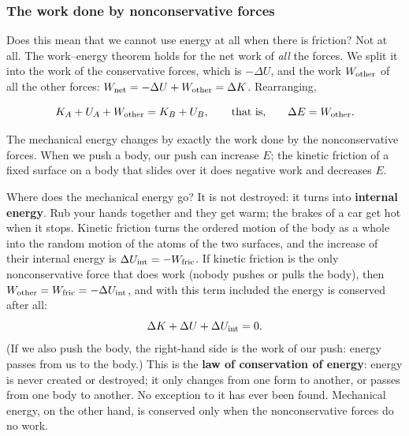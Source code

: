 \documentclass[11pt,a4paper]{article}
\begin{document}
\subsubsection{The work done by nonconservative forces}\label{sec:Wother}

Does this mean that we cannot use energy at all when there is friction? Not at all. The work--energy
theorem holds for the net work of \emph{all} the forces. We split it into the work of the
conservative forces, which is $-\Delta U$, and the work $W_{\mathrm{other}}$ of all the other forces:
$W_{\mathrm{net}} = -\Delta U + W_{\mathrm{other}} = \Delta K$. Rearranging,
\begin{keyresult}
\[
  K_A + U_A + W_{\mathrm{other}} = K_B + U_B , \qquad\text{that is,}\qquad \Delta E = W_{\mathrm{other}} .
\]
\end{keyresult}
The mechanical energy changes by exactly the work done by the nonconservative forces. When we push a
body, our push can increase $E$; the kinetic friction of a fixed surface on a body that slides over
it does negative work and decreases $E$.

Where does the mechanical energy go? It is not destroyed: it turns into \textbf{internal energy}.
Rub your hands together and they get warm; the brakes of a car get hot when it stops. Kinetic
friction turns the ordered motion of the body as a whole into the random motion of the atoms of the
two surfaces, and the increase of their internal energy is $\Delta U_{\mathrm{int}} = -W_{\mathrm{fric}}$. If
kinetic friction is the only nonconservative force that does work (nobody pushes or pulls the
body), then $W_{\mathrm{other}} = W_{\mathrm{fric}} = -\Delta U_{\mathrm{int}}$, and with this term included the
energy is conserved after all:
\[
  \Delta K + \Delta U + \Delta U_{\mathrm{int}} = 0 .
\]
(If we also push the body, the right-hand side is the work of our push: energy passes from us to the
body.) This is the \textbf{law of conservation of energy}: energy is never created or destroyed; it
only changes from one form to another, or passes from one body to another. No exception to it has ever been found. Mechanical energy, on the
other hand, is conserved only when the nonconservative forces do no work.
\end{document}
